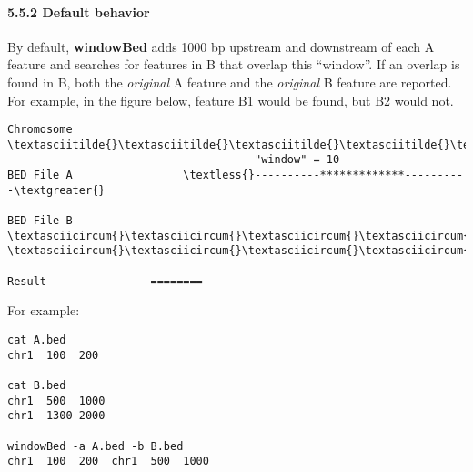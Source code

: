 \documentclass[letterpaper,10pt,english]{sphinxmanual}
\begin{document}
\paragraph{5.5.2 Default behavior}
\label{content/windowBed:default-behavior}
By default, \textbf{windowBed} adds 1000 bp upstream and downstream of each A feature and searches for
features in B that overlap this ``window''. If an overlap is found in B, both the \emph{original} A feature and the
\emph{original} B feature are reported. For example, in the figure below, feature B1 would be found, but B2
would not.

\begin{Verbatim}[commandchars=\\\{\}]
Chromosome  \textasciitilde{}\textasciitilde{}\textasciitilde{}\textasciitilde{}\textasciitilde{}\textasciitilde{}\textasciitilde{}\textasciitilde{}\textasciitilde{}\textasciitilde{}\textasciitilde{}\textasciitilde{}\textasciitilde{}\textasciitilde{}\textasciitilde{}\textasciitilde{}\textasciitilde{}\textasciitilde{}\textasciitilde{}\textasciitilde{}\textasciitilde{}\textasciitilde{}\textasciitilde{}\textasciitilde{}\textasciitilde{}\textasciitilde{}\textasciitilde{}\textasciitilde{}\textasciitilde{}\textasciitilde{}\textasciitilde{}\textasciitilde{}\textasciitilde{}\textasciitilde{}\textasciitilde{}\textasciitilde{}\textasciitilde{}\textasciitilde{}\textasciitilde{}\textasciitilde{}\textasciitilde{}\textasciitilde{}\textasciitilde{}\textasciitilde{}\textasciitilde{}\textasciitilde{}\textasciitilde{}\textasciitilde{}\textasciitilde{}\textasciitilde{}\textasciitilde{}\textasciitilde{}\textasciitilde{}\textasciitilde{}\textasciitilde{}\textasciitilde{}\textasciitilde{}\textasciitilde{}\textasciitilde{}\textasciitilde{}\textasciitilde{}\textasciitilde{}\textasciitilde{}\textasciitilde{}
                                      "window" = 10
BED File A                 \textless{}----------*************----------\textgreater{}

BED File B            \textasciicircum{}\textasciicircum{}\textasciicircum{}\textasciicircum{}\textasciicircum{}\textasciicircum{}\textasciicircum{}\textasciicircum{}                                          \textasciicircum{}\textasciicircum{}\textasciicircum{}\textasciicircum{}\textasciicircum{}\textasciicircum{}

Result                ========
\end{Verbatim}

For example:

\begin{Verbatim}[commandchars=\\\{\}]
cat A.bed
chr1  100  200

cat B.bed
chr1  500  1000
chr1  1300 2000

windowBed -a A.bed -b B.bed
chr1  100  200  chr1  500  1000
\end{Verbatim}
\end{document}
